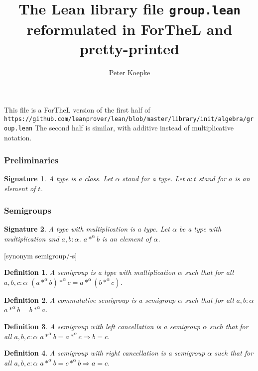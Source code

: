 \documentclass[12pt]{article}
\title{The Lean library file {\tt group.lean} reformulated in ForTheL and pretty-printed}
\author{Peter Koepke}
\newtheorem{signature}{Signature}
\newtheorem{definition}{Definition}
\begin{document}
\maketitle

This file is a ForTheL version of the first half of\\
{\footnotesize \tt https://github.com/leanprover/lean/blob/master/library/init/algebra/group.lean}
The second half is similar, with additive instead of multiplicative notation.

\subsubsection*{Preliminaries} 

\begin{signature} A \emph{type} is a class.
Let $\alpha$ stand for a type.
Let $a : t$ stand for $a$ is an element of $t$.
\end{signature}

\subsubsection*{Semigroups}

\begin{signature} A \emph{type with multiplication} is a type.
Let $\alpha$ be a type with multiplication and $a,b : \alpha$. 
$a *^{\alpha} b$ is an element of $\alpha$.
\end{signature}  

[synonym semigroup/-s]
\begin{definition} A \emph{semigroup} is a type with multiplication $\alpha$
such that for all $a,b,c : \alpha$
$(a *^{\alpha} b) *^{\alpha} c = a *^{\alpha} (b *^{\alpha} c)$. 
\end{definition}

\begin{definition} A \emph{commutative semigroup} is a semigroup $\alpha$
such that for all $a,b : \alpha$
$a *^{\alpha} b = b *^{\alpha} a$.
\end{definition}

\begin{definition} A \emph{semigroup with left cancellation} is a semigroup
$\alpha$ such that for all $a,b,c : \alpha$
$a *^{\alpha} b = a *^{\alpha} c \Rightarrow b = c$.
\end{definition}

\begin{definition} A \emph{semigroup with right cancellation} is a semigroup
$\alpha$ such that for all $a,b,c : \alpha$
$a *^{\alpha} b = c *^{\alpha} b \Rightarrow a = c$.
\end{definition}
\end{document}

